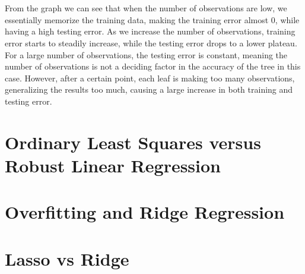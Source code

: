 \documentclass[paper=a4, fontsize=11pt]{scrartcl} %
\numberwithin{equation}{section} %
\numberwithin{figure}{section} %
\numberwithin{table}{section} %
\begin{document}
	\\\\
	From the graph we can see that when the number of observations are low, we essentially memorize the training data, making the training error almost 0, while having a high testing error. As we increase the number of observations, training error starts to steadily increase, while the testing error drops to a lower plateau. For a large number of observations, the testing error is constant, meaning the number of observations is not a deciding factor in the accuracy of the tree in this case. However, after a certain point, each leaf is making too many observations, generalizing the results too much, causing a large increase in both training and testing error.
	\newpage
	\section{Ordinary Least Squares versus Robust Linear Regression}
	
	\newpage
	\section{Overfitting and Ridge Regression}
	
	\newpage
	\section{Lasso vs Ridge}
	
\end{document}
